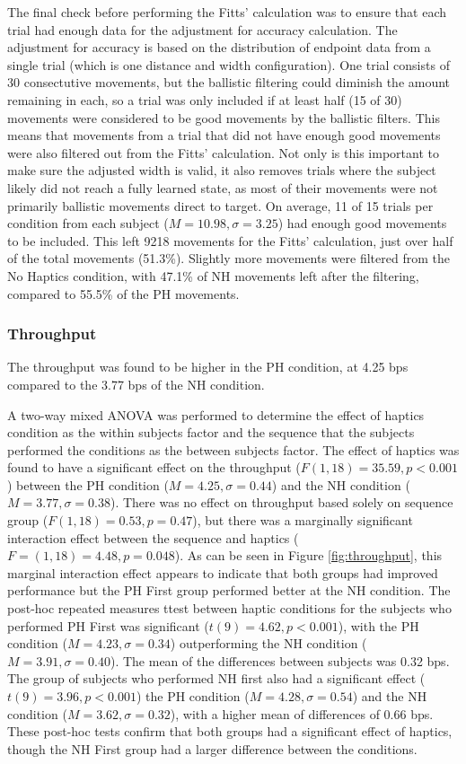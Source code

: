 The final check before performing the Fitts' calculation was to ensure that each trial had enough data for the adjustment for accuracy calculation.
The adjustment for accuracy is based on the distribution of endpoint data from a single trial (which is one distance and width configuration).
One trial consists of 30 consectutive movements, but the ballistic filtering could diminish the amount remaining in each, so a trial was only included if at least half (15 of 30) movements were considered to be good movements by the ballistic filters.
This means that movements from a trial that did not have enough good movements were also filtered out from the Fitts' calculation.
Not only is this important to make sure the adjusted width is valid, it also removes trials where the subject likely did not reach a fully learned state, as most of their movements were not primarily ballistic movements direct to target.
On average, 11 of 15 trials per condition from each subject ($M=10.98, \sigma=3.25$) had enough good movements to be included.
This left 9218 movements for the Fitts' calculation, just over half of the total movements (51.3\%).
Slightly more movements were filtered from the No Haptics condition, with 47.1\% of NH movements left after the filtering, compared to 55.5\% of the PH movements.

\subsubsection{Throughput}

The throughput was found to be higher in the PH condition, at 4.25 bps compared to the 3.77 bps of the NH condition.

A two-way mixed ANOVA was performed to determine the effect of haptics condition as the within subjects factor and the sequence that the subjects performed the conditions as the between subjects factor.
The effect of haptics was found to have a significant effect on the throughput ($F(1,18)=35.59, p<0.001$) between the PH condition ($M=4.25, \sigma=0.44$) and the NH condition ($M=3.77, \sigma=0.38$).
There was no effect on throughput based solely on sequence group ($F(1,18)=0.53, p=0.47$), but there was a marginally significant interaction effect between the sequence and haptics ($F=(1,18)=4.48, p=0.048$).
As can be seen in Figure \ref{fig:throughput}, this marginal interaction effect appears to indicate that both groups had improved performance but the PH First group performed better at the NH condition.
The post-hoc repeated measures ttest between haptic conditions for the subjects who performed PH First was significant ($t(9)=4.62, p<0.001$), with the PH condition ($M=4.23, \sigma=0.34$) outperforming the NH condition ($M=3.91, \sigma=0.40$).
The mean of the differences between subjects was 0.32 bps.
The group of subjects who performed NH first also had a significant effect ($t(9)=3.96, p<0.001$) the PH condition ($M=4.28, \sigma=0.54$) and the NH condition ($M=3.62, \sigma=0.32$), with a higher mean of differences of 0.66 bps.
These post-hoc tests confirm that both groups had a significant effect of haptics, though the NH First group had a larger difference between the conditions.

